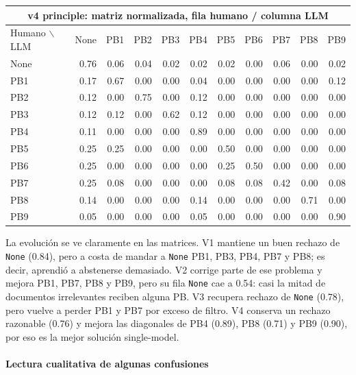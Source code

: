 \begin{center}
\tiny
\setlength{\tabcolsep}{2.4pt}
\renewcommand{\arraystretch}{1.05}
\begin{tabular}{lrrrrrrrrrr}
\toprule
\multicolumn{11}{c}{\textbf{v4 principle: matriz normalizada, fila humano / columna LLM}} \\
\midrule
Humano $\backslash$ LLM & None & PB1 & PB2 & PB3 & PB4 & PB5 & PB6 & PB7 & PB8 & PB9 \\
\midrule
None & 0.76 & 0.06 & 0.04 & 0.02 & 0.02 & 0.02 & 0.00 & 0.06 & 0.00 & 0.02 \\
PB1  & 0.17 & 0.67 & 0.00 & 0.00 & 0.04 & 0.00 & 0.00 & 0.00 & 0.00 & 0.12 \\
PB2  & 0.12 & 0.00 & 0.75 & 0.00 & 0.12 & 0.00 & 0.00 & 0.00 & 0.00 & 0.00 \\
PB3  & 0.12 & 0.12 & 0.00 & 0.62 & 0.12 & 0.00 & 0.00 & 0.00 & 0.00 & 0.00 \\
PB4  & 0.11 & 0.00 & 0.00 & 0.00 & 0.89 & 0.00 & 0.00 & 0.00 & 0.00 & 0.00 \\
PB5  & 0.25 & 0.25 & 0.00 & 0.00 & 0.00 & 0.50 & 0.00 & 0.00 & 0.00 & 0.00 \\
PB6  & 0.25 & 0.00 & 0.00 & 0.00 & 0.00 & 0.25 & 0.50 & 0.00 & 0.00 & 0.00 \\
PB7  & 0.25 & 0.08 & 0.00 & 0.00 & 0.00 & 0.08 & 0.08 & 0.42 & 0.00 & 0.08 \\
PB8  & 0.14 & 0.00 & 0.00 & 0.00 & 0.14 & 0.00 & 0.00 & 0.00 & 0.71 & 0.00 \\
PB9  & 0.05 & 0.00 & 0.00 & 0.00 & 0.05 & 0.00 & 0.00 & 0.00 & 0.00 & 0.90 \\
\bottomrule
\end{tabular}
\end{center}

La evolución se ve claramente en las matrices. V1 mantiene un buen rechazo de \texttt{None} (0.84), pero a costa de mandar a \texttt{None} PB1, PB3, PB4, PB7 y PB8; es decir, aprendió a abstenerse demasiado. V2 corrige parte de ese problema y mejora PB1, PB7, PB8 y PB9, pero su fila \texttt{None} cae a 0.54: casi la mitad de documentos irrelevantes reciben alguna PB. V3 recupera rechazo de \texttt{None} (0.78), pero vuelve a perder PB1 y PB7 por exceso de filtro. V4 conserva un rechazo razonable (0.76) y mejora las diagonales de PB4 (0.89), PB8 (0.71) y PB9 (0.90), por eso es la mejor solución single-model.

\paragraph*{Lectura cualitativa de algunas confusiones}

